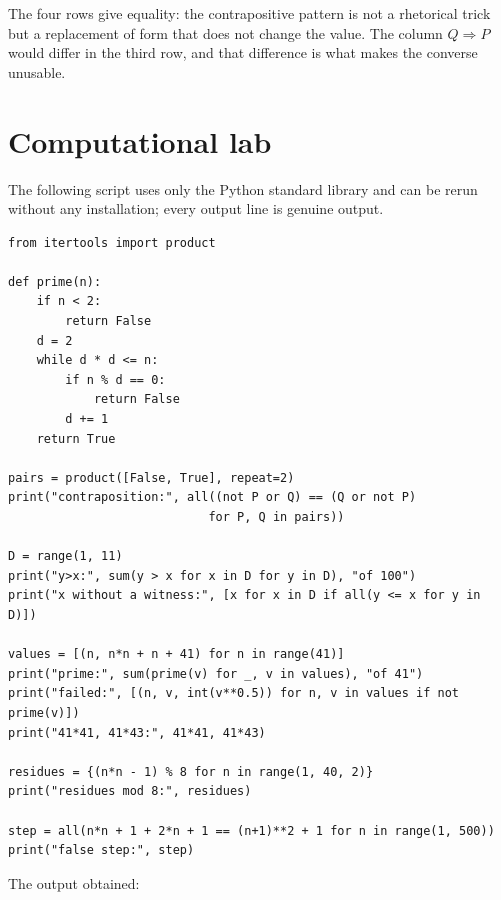 The four rows give equality: the contrapositive pattern is not a rhetorical trick but a replacement
of form that does not change the value. The column $Q \Rightarrow P$ would differ in the third row,
and that difference is what makes the converse unusable.


\section{Computational lab}

The following script uses only the Python standard library and can be rerun without
any installation; every output line is genuine output.

\begin{lab}
\begin{verbatim}
from itertools import product

def prime(n):
    if n < 2:
        return False
    d = 2
    while d * d <= n:
        if n % d == 0:
            return False
        d += 1
    return True

pairs = product([False, True], repeat=2)
print("contraposition:", all((not P or Q) == (Q or not P)
                            for P, Q in pairs))

D = range(1, 11)
print("y>x:", sum(y > x for x in D for y in D), "of 100")
print("x without a witness:", [x for x in D if all(y <= x for y in D)])

values = [(n, n*n + n + 41) for n in range(41)]
print("prime:", sum(prime(v) for _, v in values), "of 41")
print("failed:", [(n, v, int(v**0.5)) for n, v in values if not prime(v)])
print("41*41, 41*43:", 41*41, 41*43)

residues = {(n*n - 1) % 8 for n in range(1, 40, 2)}
print("residues mod 8:", residues)

step = all(n*n + 1 + 2*n + 1 == (n+1)**2 + 1 for n in range(1, 500))
print("false step:", step)
\end{verbatim}
\end{lab}

The output obtained:

